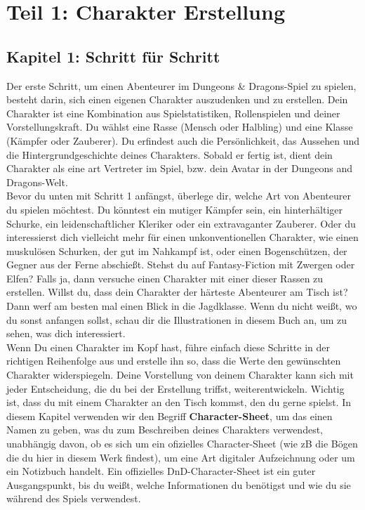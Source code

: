 \chapter{Teil 1: Charakter Erstellung}

\section{Kapitel 1: Schritt für Schritt}
Der erste Schritt, um einen Abenteurer im Dungeons & Dragons-Spiel zu spielen, besteht darin, sich einen eigenen Charakter auszudenken und zu erstellen. Dein Charakter ist eine Kombination aus Spielstatistiken, Rollenspielen und deiner Vorstellungskraft. Du wählst eine Rasse (Mensch oder Halbling) und eine Klasse (Kämpfer oder Zauberer). Du erfindest auch die Persönlichkeit, das Aussehen und die Hintergrundgeschichte deines Charakters. Sobald er fertig ist, dient dein Charakter als eine art Vertreter im Spiel, bzw. dein Avatar in der Dungeons and Dragons-Welt.\\
Bevor du unten mit Schritt 1 anfängst, überlege dir, welche Art von Abenteurer du spielen möchtest. Du könntest ein mutiger Kämpfer sein, ein hinterhältiger Schurke, ein leidenschaftlicher Kleriker oder ein extravaganter Zauberer. Oder du interessierst dich vielleicht mehr für einen unkonventionellen Charakter, wie einen muskulösen Schurken, der gut im Nahkampf ist, oder einen Bogenschützen, der Gegner aus der Ferne abschießt. Stehst du auf Fantasy-Fiction mit Zwergen oder Elfen? Falls ja, dann versuche einen Charakter mit einer dieser Rassen zu erstellen. Willst du, dass dein Charakter der härteste Abenteurer am Tisch ist? Dann werf am besten mal einen Blick in die Jagdklasse. Wenn du nicht weißt, wo du sonst anfangen sollst, schau dir die Illustrationen in diesem Buch an, um zu sehen, was dich interessiert.\\
Wenn Du einen Charakter im Kopf hast, führe einfach diese Schritte in der richtigen Reihenfolge aus und erstelle ihn so, dass die Werte den gewünschten Charakter widerspiegeln. Deine Vorstellung von deinem Charakter kann sich mit jeder Entscheidung, die du bei der Erstellung triffst, weiterentwickeln. Wichtig ist, dass du mit einem Charakter an den Tisch kommst, den du gerne spielst. In diesem Kapitel verwenden wir den Begriff \textbf{Character-Sheet}, um das einen Namen zu geben, was du zum Beschreiben deines Charakters verwendest, unabhängig davon, ob es sich um ein ofizielles Character-Sheet (wie zB die Bögen die du hier in diesem Werk findest), um eine Art digitaler Aufzeichnung oder um ein Notizbuch handelt. Ein offizielles DnD-Character-Sheet ist ein guter Ausgangspunkt, bis du weißt, welche Informationen du benötigst und wie du sie während des Spiels verwendest.
